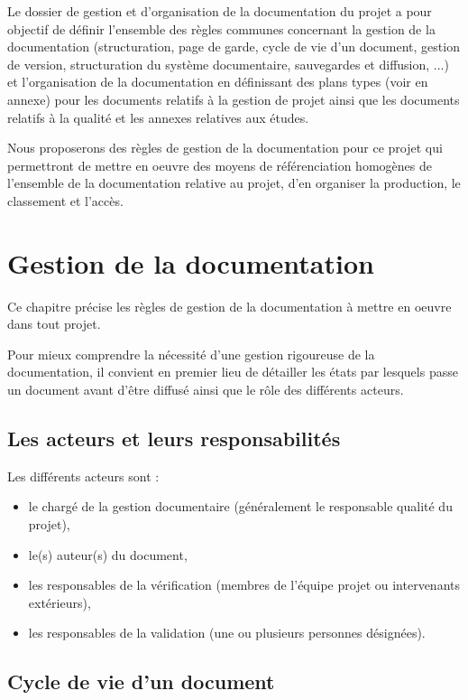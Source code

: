 \documentclass[a4paper]{article}
\begin{document}
Le dossier de gestion et d'organisation de la documentation du projet a pour objectif de définir l’ensemble des règles
communes concernant la gestion de la documentation (structuration, page de garde, cycle de vie d’un
document, gestion de version, structuration du système documentaire, sauvegardes et diffusion, ...) et
l’organisation de la documentation en définissant des plans types (voir en annexe) pour les documents relatifs à la gestion de
projet ainsi que les documents relatifs à la qualité et les annexes relatives aux études.

Nous proposerons des règles de gestion de la documentation pour ce projet qui permettront de mettre en oeuvre des moyens
de référenciation homogènes de l'ensemble de la documentation relative au projet, d'en organiser la production, le classement
et l'accès.

\section{Gestion de la documentation}

Ce chapitre précise les règles de gestion de la documentation à mettre en oeuvre dans tout projet.

Pour mieux comprendre la nécessité d’une gestion rigoureuse de la documentation, il convient en premier lieu de détailler les états par lesquels passe un document avant d’être diffusé ainsi que le rôle des différents acteurs.

\subsection{Les acteurs et leurs responsabilités}

Les différents acteurs sont :

\begin{itemize}
\item le chargé de la gestion documentaire (généralement le responsable qualité du projet),
\item le(s) auteur(s) du document,
\item les responsables de la vérification (membres de l’équipe projet ou intervenants extérieurs),
\item les responsables de la validation (une ou plusieurs personnes désignées).
\end{itemize}


\subsection{Cycle de vie d'un document}
\end{document}
